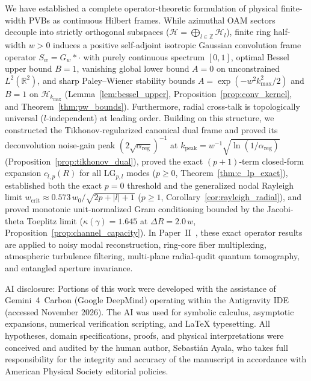 \documentclass[aps,pra,onecolumn,notitlepage,11pt,tightenlines,nofootinbib,floatfix,longbibliography]{revtex4-2}
\theoremstyle{remark}
\newcommand{\abs}[1]{\lvert #1 \rvert}
\begin{document}
We have established a complete operator-theoretic formulation of physical finite-width PVBs as continuous Hilbert frames. While azimuthal OAM sectors decouple into strictly orthogonal subspaces ($\mathcal{H} = \bigoplus_{l\in\mathbb{Z}}\mathcal{H}_l$), finite ring half-width $w > 0$ induces a positive self-adjoint isotropic Gaussian convolution frame operator $S_w = G_w * \cdot$ with purely continuous spectrum $[0,1]$, optimal Bessel upper bound $B = 1$, vanishing global lower bound $A = 0$ on unconstrained $L^2(\mathbb{R}^2)$, and sharp Paley--Wiener stability bounds $A = \exp(-w^2 k_{\max}^2/2)$ and $B = 1$ on $\mathcal{H}_{k_{\max}}$ (Lemma~\ref{lem:bessel_upper}, Proposition~\ref{prop:conv_kernel}, and Theorem~\ref{thm:pw_bounds}). Furthermore, radial cross-talk is topologically universal ($l$-independent) at leading order. Building on this structure, we constructed the Tikhonov-regularized canonical dual frame and proved its deconvolution noise-gain peak $(2\sqrt{\alpha_{\mathrm{reg}}})^{-1}$ at $k_{\mathrm{peak}} = w^{-1}\sqrt{\ln(1/\alpha_{\mathrm{reg}})}$ (Proposition~\ref{prop:tikhonov_dual}), proved the exact $(p+1)$-term closed-form expansion $c_{l,p}(R)$ for all $\mathrm{LG}_{p,l}$ modes ($p \ge 0$, Theorem~\ref{thm:c_lp_exact}), established both the exact $p = 0$ threshold and the generalized nodal Rayleigh limit $w_{\mathrm{crit}} \approx 0.573\,w_0/\sqrt{2p+\abs{l}+1}$ ($p \ge 1$, Corollary~\ref{cor:rayleigh_radial}), and proved monotonic unit-normalized Gram conditioning bounded by the Jacobi-theta Toeplitz limit ($\kappa(\gamma) = 1.645$ at $\Delta R = 2.0\,w$, Proposition~\ref{prop:channel_capacity}). In Paper~II~\cite{AyalaPaperII}, these exact operator results are applied to noisy modal reconstruction, ring-core fiber multiplexing, atmospheric turbulence filtering, multi-plane radial-qudit quantum tomography, and entangled aperture invariance.

\begin{acknowledgments}
AI disclosure: Portions of this work were developed with the assistance of Gemini~4~Carbon (Google DeepMind) operating within the Antigravity IDE (accessed November 2026). The AI was used for symbolic calculus, asymptotic expansions, numerical verification scripting, and \LaTeX{} typesetting. All hypotheses, domain specifications, proofs, and physical interpretations were conceived and audited by the human author, Sebasti\'an Ayala, who takes full responsibility for the integrity and accuracy of the manuscript in accordance with American Physical Society editorial policies.
\end{acknowledgments}
\end{document}
